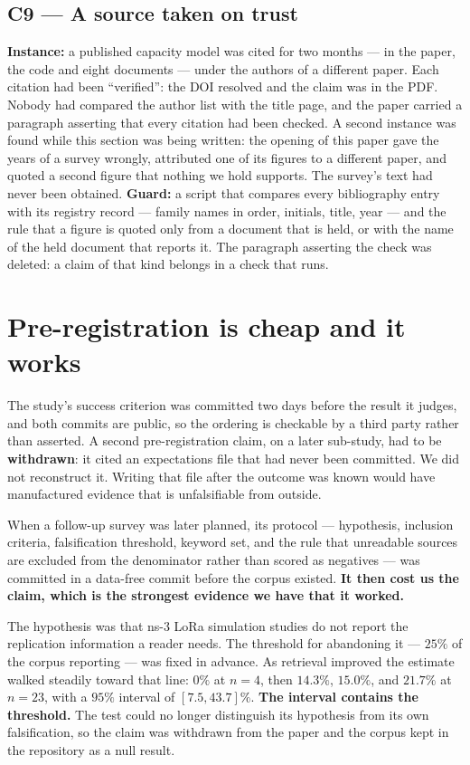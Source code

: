 \documentclass[conference]{IEEEtran}
\begin{document}
\subsection{C9 --- A source taken on trust}
\textbf{Instance:} a published capacity model was cited for two months --- in the paper, the
code and eight documents --- under the authors of a different paper. Each citation had been
``verified'': the DOI resolved and the claim was in the PDF. Nobody had compared the author list
with the title page, and the paper carried a paragraph asserting that every citation had been
checked. A second instance was found while this section was being written: the opening of this
paper gave the years of a survey wrongly, attributed one of its figures to a different paper, and
quoted a second figure that nothing we hold supports. The survey's text had never been obtained.
\textbf{Guard:} a script that compares every bibliography entry with its registry record ---
family names in order, initials, title, year --- and the rule that a figure is quoted only from a
document that is held, or with the name of the held document that reports it. The paragraph
asserting the check was deleted: a claim of that kind belongs in a check that runs.

\section{Pre-registration is cheap and it works}
The study's success criterion was committed two days before the result it judges, and both commits
are public, so the ordering is checkable by a third party rather than asserted. A second
pre-registration claim, on a later sub-study, had to be \textbf{withdrawn}: it cited an expectations
file that had never been committed. We did not reconstruct it. Writing that file after the outcome
was known would have manufactured evidence that is unfalsifiable from outside.

When a follow-up survey was later planned, its protocol --- hypothesis, inclusion criteria,
falsification threshold, keyword set, and the rule that unreadable sources are excluded from the
denominator rather than scored as negatives --- was committed in a data-free commit before the
corpus existed. \textbf{It then cost us the claim, which is the strongest evidence we have that it
worked.}

The hypothesis was that ns-3 LoRa simulation studies do not report the replication information a
reader needs. The threshold for abandoning it --- $25\%$ of the corpus reporting --- was fixed in
advance. As retrieval improved the estimate walked steadily toward that line: $0\%$ at $n{=}4$,
then $14.3\%$, $15.0\%$, and $21.7\%$ at $n{=}23$, with a $95\%$ interval of $[7.5, 43.7]\%$.
\textbf{The interval contains the threshold.} The test could no longer distinguish its hypothesis
from its own falsification, so the claim was withdrawn from the paper and the corpus kept in the
repository as a null result.
\end{document}
